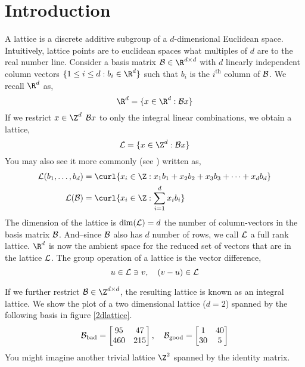 \documentclass{homework}
\begin{document}
\begin{abstract}
  \blindtext
\end{abstract}
\maketitle

\section{Introduction}\label{intro}

A lattice is a discrete additive subgroup of a $d$-dimensional
Euclidean space. Intuitively, lattice points are to euclidean spaces
what multiples of $d$ are to the real number line. Consider a basis
matrix $\B \in \R^{d \times d}$ with $d$ linearly independent column
vectors $\{1 \leq i \leq d : b_i \in \R^d\}$ such that $b_i$ is the
$i^\text{th}$ column of $\mathcal{B}$. We recall $\R^d$ as,
\[
  \R^d = \{x \in \R^d : \B x\}
\]
If we restrict $x\in \Z^d$ \ie $\mathcal{B} x$ to only the integral linear
combinations, we obtain a lattice,
\[
  \L = \{x \in \Z^d : \B x\}
\]
You may also see it more commonly (see
\cite{micciancio2002complexity}) written as,
\begin{align*}
  \L(b_1,\dots,b_d)
         & = \curl{x_i \in \Z : x_1b_1 + x_2b_2 + x_3b_3 + \cdots + x_db_d} \\
  \L(\B) & = \curl{x_i \in \Z : \sum_{i=1}^{d}x_ib_i}
\end{align*}
The dimension of the lattice is $\dim(\mathcal{L}) = d$ \ie the number of
column-vectors in the basis matrix $\mathcal{B}$. And--since $\mathcal{B}$ also has $d$
number of rows, we call $\mathcal{L}$ a full rank lattice. $\R^d$ is now the
ambient space for the reduced set of vectors that are in the lattice
$\mathcal{L}$. The group operation of a lattice is the vector difference,
\[
  u \in \mathcal{L} \ni v,\quad (v - u) \in \mathcal{L}
\]

If we further restrict $\B \in \Z^{d \times d}$, the resulting lattice
is known as an integral lattice. We show the plot of a two dimensional
lattice ($d=2$) spanned by the following basis in figure
\ref{2dlattice}.
\[
  \mathcal{B}_\text{bad} =
  \begin{bmatrix}
    95  & 47  \\
    460 & 215
  \end{bmatrix},
  \quad
  \mathcal{B}_\text{good} =
  \begin{bmatrix}
    1  & 40 \\
    30 & 5
  \end{bmatrix}
\]
You might imagine another trivial lattice $\Z^2$ spanned by the
identity matrix.
\end{document}
